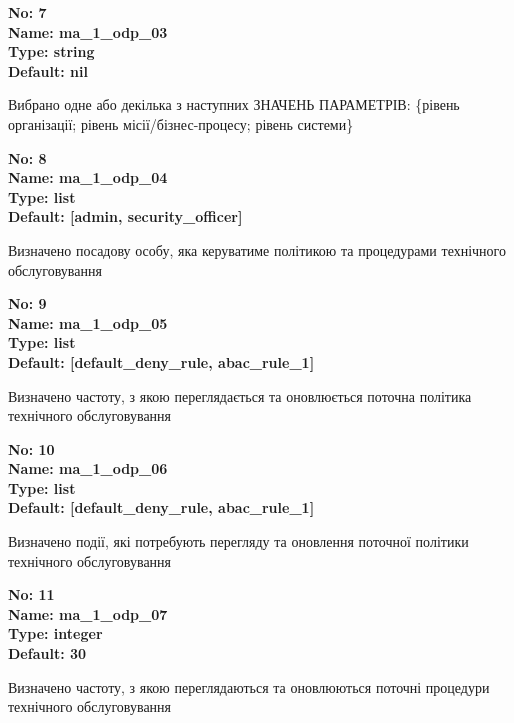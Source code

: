 \documentclass{article}
\begin{document}
{\footnotesize\bfseries
No: 7\\
Name: ma\_\allowbreak{}1\_\allowbreak{}odp\_\allowbreak{}03\\
Type: string\\
Default: nil
}

{\footnotesize Вибрано одне або декілька з наступних ЗНАЧЕНЬ ПАРАМЕТРІВ: \{рівень організації; рівень місії/бізнес-процесу; рівень системи\}}


{\footnotesize\bfseries
No: 8\\
Name: ma\_\allowbreak{}1\_\allowbreak{}odp\_\allowbreak{}04\\
Type: list\\
Default: [\textquotedbl{}admin\textquotedbl{}, \textquotedbl{}security\_\allowbreak{}officer\textquotedbl{}]
}

{\footnotesize Визначено посадову особу, яка керуватиме політикою та процедурами технічного обслуговування}


{\footnotesize\bfseries
No: 9\\
Name: ma\_\allowbreak{}1\_\allowbreak{}odp\_\allowbreak{}05\\
Type: list\\
Default: [\textquotedbl{}default\_\allowbreak{}deny\_\allowbreak{}rule\textquotedbl{}, \textquotedbl{}abac\_\allowbreak{}rule\_\allowbreak{}1\textquotedbl{}]
}

{\footnotesize Визначено частоту, з якою переглядається та оновлюється поточна політика технічного обслуговування}


{\footnotesize\bfseries
No: 10\\
Name: ma\_\allowbreak{}1\_\allowbreak{}odp\_\allowbreak{}06\\
Type: list\\
Default: [\textquotedbl{}default\_\allowbreak{}deny\_\allowbreak{}rule\textquotedbl{}, \textquotedbl{}abac\_\allowbreak{}rule\_\allowbreak{}1\textquotedbl{}]
}

{\footnotesize Визначено події, які потребують перегляду та оновлення поточної політики технічного обслуговування}


{\footnotesize\bfseries
No: 11\\
Name: ma\_\allowbreak{}1\_\allowbreak{}odp\_\allowbreak{}07\\
Type: integer\\
Default: 30
}

{\footnotesize Визначено частоту, з якою переглядаються та оновлюються поточні процедури технічного обслуговування}
\end{document}
